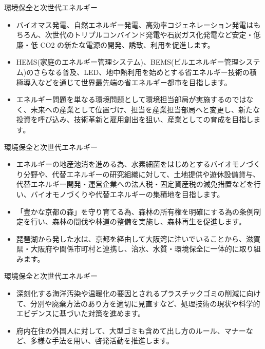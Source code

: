 \documentclass[dvipdfmx]{beamer}
\begin{document}
    \begin{frame}{環境保全と次世代エネルギー}{}
        \begin{small}
            \begin{itemize}
                \setlength{\itemsep}{2mm}
                \item バイオマス発電、自然エネルギー発電、高効率コジェネレーション発電はもちろん、次世代のトリプルコンバインド発電や石炭ガス化発電など安定・低廉・低 CO2 の新たな電源の開発、誘致、利用を促進します。
                \item HEMS(家庭のエネルギー管理システム)、BEMS(ビルエネルギー管理システム)のさらなる普及、LED、地中熱利用を始めとする省エネルギー技術の積極導入などを通じて世界最先端の省エネルギー都市を目指します。
                \item エネルギー問題を単なる環境問題として環境担当部局が実施するのではなく、未来への産業として位置づけ、担当を産業担当部局へと変更し、新たな投資を呼び込み、技術革新と雇用創出を狙い、産業としての育成を目指します。
            \end{itemize}
        \end{small}
    \end{frame}

    \begin{frame}{環境保全と次世代エネルギー}{}
        \begin{small}
            \begin{itemize}
                \setlength{\itemsep}{2mm}
                \item エネルギーの地産池消を進める為、水素細菌をはじめとするバイオモノづくり分野や、代替エネルギーの研究組織に対して、土地提供や遊休設備貸与、代替エネルギー開発・運営企業への法人税・固定資産税の減免措置などを行い、バイオモノづくりや代替エネルギーの集積地を目指します。
                \item 「豊かな京都の森」を守り育てる為、森林の所有権を明確にする為の条例制定を行い、森林の間伐や林道の整備を実施し、森林再生を促進します。
                \item 琵琶湖から発した水は、京都を経由して大阪湾に注いでいることから、滋賀県・大阪府や関係市町村と連携し、治水、水質・環境保全に一体的に取り組みます。
            \end{itemize}
        \end{small}
    \end{frame}

    \begin{frame}{環境保全と次世代エネルギー}{}
        \begin{small}
            \begin{itemize}
                \setlength{\itemsep}{2mm}
                \item 深刻化する海洋汚染や温暖化の要因とされるプラスチックゴミの削減に向けて、分別や廃棄方法のあり方を適切に見直すなど、処理技術の現状や科学的エビデンスに基づいた対策を進めます。
                \item 府内在住の外国人に対して、大型ゴミも含めて出し方のルール、マナーなど、多様な手法を用い、啓発活動を推進します。
            \end{itemize}
        \end{small}
    \end{frame}
\end{document}
